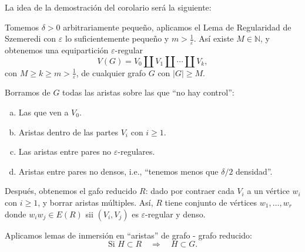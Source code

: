 \documentclass[12pt]{report}
\theoremstyle{plain}
\theoremstyle{definition}
\newcommand{\naturals}{\mathbb{N}}
\newcommand{\abs}[1]{\left \vert #1 \right \vert}
\begin{document}
La idea de la demostración del corolario será la siguiente:

\bigskip

Tomemos $\delta > 0$ arbitrariamente pequeño, aplicamos el Lema de Regularidad de Szemeredi con $\varepsilon $ lo suficientemente pequeño y $m > \frac 1 \varepsilon$. Así existe $M \in \naturals$, y obtenemos una equipartición $\varepsilon$-regular
\[
 V(G) = V_0 \coprod V_1 \coprod \cdots \coprod V_k,
\]
con $M \geq k \geq m > \frac 1 \varepsilon$, de cualquier grafo $G$ con $\abs G \geq M$.

Borramos de $G$ todas las aristas sobre las que ``no hay control'':
\begin{enumerate}[(a)]
\item Las que ven a $V_0$.
\item Aristas dentro de las partes $V_i$ con $i \geq 1$.
\item Las aristas entre pares no $\varepsilon$-regulares.
\item Aristas entre pares no densos, i.e., ``tenemos menos que $\delta / 2$ densidad''.
\end{enumerate}

Después, obtenemos el gafo reducido $R$: dado por contraer cada $V_i$ a un vértice $w_i$ con $i \geq 1$, y borrar aristas múltiples. Así, $R$ tiene conjunto de vértices $w_1, \ldots, w_r$ donde $w_{i}w_j \in E(R)$ sii $(V_i, V_j)$ es $\varepsilon$-regular y denso.

Aplicamos lemas de inmersión en ``aristas'' de grafo - grafo reducido:
\[
    \text{Si $H \subset R$} \quad \Rightarrow \quad H \subset G.
\]
\end{document}

